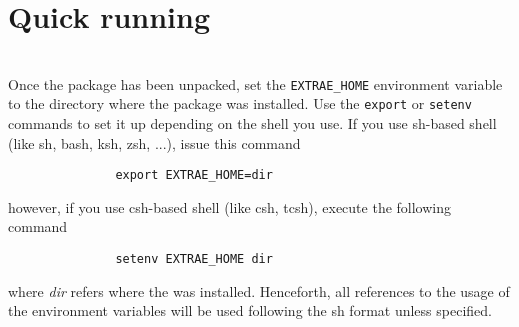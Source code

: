 % 
% 

\section{Quick running}

\\

 Once the package has been unpacked, set the {\tt EXTRAE\_HOME} environment variable to the directory where the package was installed. Use the {\tt export} or {\tt setenv} commands to set it up depending on the shell you use.  If you use sh-based shell (like sh, bash, ksh, zsh, ...), issue this command
\begin{verbatim}
               export EXTRAE_HOME=dir
\end{verbatim}
however, if you use csh-based shell (like csh, tcsh), execute the following command
\begin{verbatim}
               setenv EXTRAE_HOME dir
\end{verbatim}
where {\em dir} refers where the \TRACE was installed. Henceforth, all references to the usage of the environment variables will be used following the sh format unless specified.

